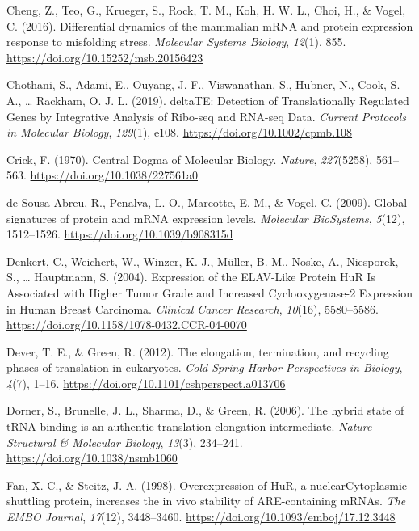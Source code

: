 \documentclass[12pt,openany]{book}
\begin{document}
\hypertarget{ref-Cheng2016}{}
Cheng, Z., Teo, G., Krueger, S., Rock, T. M., Koh, H. W. L., Choi, H.,
\& Vogel, C. (2016). Differential dynamics of the mammalian mRNA and
protein expression response to misfolding stress. \emph{Molecular
Systems Biology}, \emph{12}(1), 855.
\url{https://doi.org/10.15252/msb.20156423}

\hypertarget{ref-Chothani2019}{}
Chothani, S., Adami, E., Ouyang, J. F., Viswanathan, S., Hubner, N.,
Cook, S. A., \ldots{} Rackham, O. J. L. (2019). deltaTE: Detection of
Translationally Regulated Genes by Integrative Analysis of Ribo-seq and
RNA-seq Data. \emph{Current Protocols in Molecular Biology},
\emph{129}(1), e108. \url{https://doi.org/10.1002/cpmb.108}

\hypertarget{ref-Crick1970}{}
Crick, F. (1970). Central Dogma of Molecular Biology. \emph{Nature},
\emph{227}(5258), 561--563. \url{https://doi.org/10.1038/227561a0}

\hypertarget{ref-deSousaAbreu2009}{}
de Sousa Abreu, R., Penalva, L. O., Marcotte, E. M., \& Vogel, C.
(2009). Global signatures of protein and mRNA expression levels.
\emph{Molecular BioSystems}, \emph{5}(12), 1512--1526.
\url{https://doi.org/10.1039/b908315d}

\hypertarget{ref-Denkert2004}{}
Denkert, C., Weichert, W., Winzer, K.-J., Müller, B.-M., Noske, A.,
Niesporek, S., \ldots{} Hauptmann, S. (2004). Expression of the
ELAV-Like Protein HuR Is Associated with Higher Tumor Grade and
Increased Cyclooxygenase-2 Expression in Human Breast Carcinoma.
\emph{Clinical Cancer Research}, \emph{10}(16), 5580--5586.
\url{https://doi.org/10.1158/1078-0432.CCR-04-0070}

\hypertarget{ref-Dever2012}{}
Dever, T. E., \& Green, R. (2012). The elongation, termination, and
recycling phases of translation in eukaryotes. \emph{Cold Spring Harbor
Perspectives in Biology}, \emph{4}(7), 1--16.
\url{https://doi.org/10.1101/cshperspect.a013706}

\hypertarget{ref-Dorner2006}{}
Dorner, S., Brunelle, J. L., Sharma, D., \& Green, R. (2006). The hybrid
state of tRNA binding is an authentic translation elongation
intermediate. \emph{Nature Structural \& Molecular Biology},
\emph{13}(3), 234--241. \url{https://doi.org/10.1038/nsmb1060}

\hypertarget{ref-Fan1998}{}
Fan, X. C., \& Steitz, J. A. (1998). Overexpression of HuR, a
nuclearCytoplasmic shuttling protein, increases the in vivo stability of
ARE-containing mRNAs. \emph{The EMBO Journal}, \emph{17}(12),
3448--3460. \url{https://doi.org/10.1093/emboj/17.12.3448}
\end{document}

